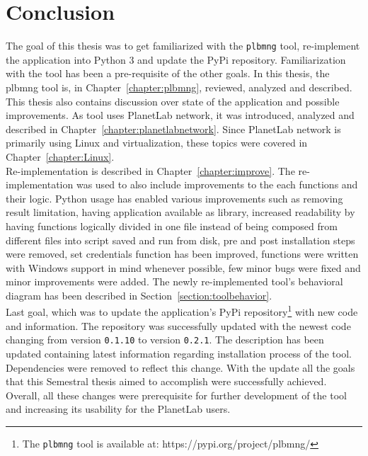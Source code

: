 \chapter{Conclusion}
The goal of this thesis was to get familiarized with the \texttt{plbmng} tool, re-implement the application into Python 3 and update the PyPi repository. Familiarization with the tool has been a pre-requisite of the other goals. In this thesis, the plbmng tool is, in Chapter~\ref{chapter:plbmng}, reviewed, analyzed and described. This thesis also contains discussion over state of the application and possible improvements. As tool uses PlanetLab network, it was introduced, analyzed and described in Chapter~\ref{chapter:planetlabnetwork}. Since PlanetLab network is primarily using Linux and virtualization, these topics were covered in Chapter~\ref{chapter:Linux}.\\
Re-implementation is described in Chapter~\ref{chapter:improve}. The re-implementation was used to also include improvements to the each functions and their logic. Python usage has enabled various improvements such as removing result limitation, having application available as library, increased readability by having functions logically divided in one file instead of being composed from different files into script saved and run from disk, pre and post installation steps were removed, set credentials function has been improved, functions were written with Windows support in mind whenever possible, few minor bugs were fixed and minor improvements were added. The newly re-implemented tool's behavioral diagram has been described in Section~\ref{section:toolbehavior}.\\
Last goal, which was to update the application's PyPi repository\footnote{The \texttt{plbmng} tool is available at: https://pypi.org/project/plbmng/} with new code and information. The repository was successfully updated with the newest code changing from version \texttt{0.1.10} to version \texttt{0.2.1}. The description has been updated containing latest information regarding installation process of the tool. Dependencies were removed to reflect this change. With the update all the goals that this Semestral thesis aimed to accomplish were successfully achieved. Overall, all these changes were prerequisite for further development of the tool and increasing its usability for the PlanetLab users.
